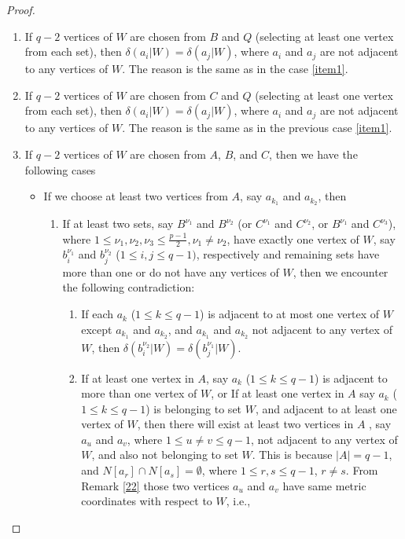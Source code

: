 \documentclass[10pt,a4paper]{amsart}
\begin{document}
\begin{proof}
\begin{enumerate}
\begin{itemize}
\begin{enumerate}
        \end{enumerate}
     \item If all the sets $B^{\nu_1}$ and $C^{\nu_2}$ (where $1\leq \nu_1,\nu_2 \leq \frac{p-1}{2})$ either contain more than one vertex of  $W$ or do not contain any vertex of $W$, then there exist at least two sets do not contain any vertex of $W$, which we will denote by $B^{\nu_3}$ and $B^{\nu_4}$. This is because $W$ has $q-2$ vertices, and $q-2<2p-4$. Therefore, From Remark \ref{last} $\delta(q_i|W) = \delta(q_j|W)$, where $q_i$ and $q_j$ are adjacent to vertices of $B^{\nu_3}$ and $B^{\nu_4}$ respectively.  
   \end{itemize}
\item If $q-2$ vertices of $W$ are chosen from $B$ and $Q$ (selecting at least one vertex from each set), then $\delta(a_i|W) = \delta(a_j|W)$, where $a_i$ and $a_j$ are not adjacent to any vertices of $W$. The reason is the same as in the case \ref{item1}.
 \item If $q-2$ vertices of $W$ are chosen from $C$ and $Q$ (selecting at least one vertex from each set), then $\delta(a_i|W) = \delta(a_j|W)$, where $a_i$ and $a_j$ are not adjacent to any vertices of $W$. The reason is the same as in the previous case \ref{item1}.
 \item If $q-2$ vertices of $W$ are chosen from $A$, $B$, and $C$, then we have the following cases
 \begin{itemize}
     \item  If we choose at least two vertices from $A$, say $a_{k_1}$ and $a_{k_2}$, then
     \begin{enumerate}
         \item If at least two sets, say $B^{\nu_1}$ and $B^{\nu_2}$ (or $C^{\nu_1}$ and $C^{\nu_2}$, or $B^{\nu_1}$ and $C^{\nu_3}$), where $1\leq \nu_1, \nu_2, \nu_3 \leq \frac{p-1}{2}, \nu_1\neq \nu_2$, have exactly one vertex of $W$, say $b^{\nu_1}_i$ and $b^{\nu_2}_j$ ($1\leq i,j \leq q-1)$, respectively and remaining sets have more than one or do not have any vertices of $W$, then we encounter the following contradiction: 
         \begin{enumerate}
        \item If each $a_k$ ($1\leq k \leq q-1$) is adjacent to at most one vertex of $W$ except $a_{k_1}$ and $a_{k_2}$, and $a_{k_1}$ and $a_{k_2}$ not adjacent to any vertex of $W$, then $\delta( b^{\nu_2}_i|W) =\delta( b^{\nu_1}_{j}|W)$.
       \item If at least one vertex in $A$, say $a_k$ ($1\leq k \leq q-1$) is adjacent to more than one vertex of $W$, or If at least one vertex in $A$ say $a_k$ ($1\leq k \leq q-1$) is belonging to set $W$, and adjacent to at least one vertex of $W$, then there will exist at least two vertices in $A$ , say $a_u $ and $a_v $, where $1\leq u \neq v \leq q-1$, not adjacent to any vertex of $W$, and also not belonging to set $W$. This is because $|A|=q-1$, and $N[a_r]\cap N[a_s]=\emptyset$, where $1\leq r,s\leq q-1$, $r\neq s$. From Remark \ref{22} those two vertices $a_u $ and $a_v $ have same metric coordinates with respect to $W$, i.e.,      

\end{enumerate}
\end{enumerate}
\end{itemize}
\end{enumerate}
\end{proof}
\end{document}

